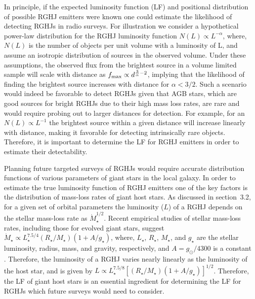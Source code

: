 \documentclass[iop,numberedappendix,apj]{emulateapj}
\begin{document}
In principle, if the expected luminosity function (LF) and positional distribution of possible RGHJ emitters were known one could estimate the likelihood of detecting RGHJs in radio surveys. For illustration we consider a hypothetical power-law distribution for the RGHJ luminosity function $N(L) \propto L^{-\alpha}$, where, $N(L)$ is the number of objects per unit volume with a luminosity of L, and assume an isotropic distribution of sources in the observed volume. Under these assumptions, the observed flux from the brightest source in a volume limited sample will scale with distance as $f_{\rm max} \propto d^{\frac{3}{\alpha} - 2}$, implying that the likelihood of finding the brightest source increases with distance for $\alpha < 3/2$. Such a scenario would indeed be favorable to detect RGHJs given that AGB stars, which are good sources for bright RGHJs due to their high mass loss rates, are rare and would require probing out to larger distances for detection. For example, for an $N(L) \propto L^{-1}$ the brightest source within a given distance will increase linearly with distance, making it favorable for detecting intrinsically rare objects. Therefore, it is important to determine the LF for RGHJ emitters in order to estimate their detectability. 

Planning future targeted surveys of RGHJs would require accurate distribution functions of various parameters of giant stars in the local galaxy. In order to estimate the true luminosity function of RGHJ emitters one of the key factors is the distribution of mass-loss rates of giant host stars. As discussed in section~3.2, for a given set of orbital parameters the luminosity ($L$) of a RGHJ depends on the stellar mass-loss rate as $\dot{M}_\star^{1/2}$. Recent empirical studies of stellar mass-loss rates, including those for evolved giant stars, suggest $\dot{M}_\star \propto L_\star^{7.5/4} (R_\star/M_\star)(1+A/g_\star)$, where, $L_\star$,  $R_\star$, $M_\star$, and $g_\star$ are the stellar luminosity, radius, mass, and gravity, respectively, and $A  = g_\odot/4300$ is a constant \citep{schroder2005,schroder2007}. 
Therefore, the luminosity of a RGHJ varies nearly linearly as the luminosity of the host star, and is given by $L \propto L_\star^{7.5/8} [(R_\star/M_\star)(1+A/g_\star)]^{1/2}$. Therefore, the LF of giant host stars is an essential ingredient for determining the LF for RGHJs which future surveys would need to consider. 



\end{document}
